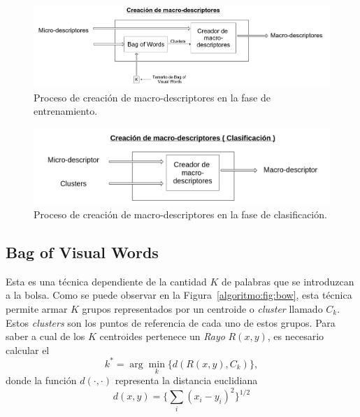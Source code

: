 	
	
		\begin{figure}[bt]
			\centering
			\includegraphics[width=1\textwidth]{Figuras/Diagramas/Extractor_macrodescriptores_entrenamiento.png}
			\caption{Proceso de creación de macro-descriptores en la fase de entrenamiento.}
			\label{algoritmo:fig:macro_descriptores:entrenamiento}
		\end{figure}
	\begin{figure}[bt]
		\centering
    		\includegraphics[width=1\textwidth]{Figuras/Diagramas/Extractor_macrodescriptores_clasificacion.png}
  		\caption{Proceso de creación de macro-descriptores en la fase de clasificación.}
  		\label{algoritmo:fig:macro_descriptores:clasificacion}
	\end{figure}	



	\subsection{Bag of Visual Words}
	\label{algoritmo:bow}
		Esta es una técnica dependiente de la cantidad $K$ de palabras que se introduzcan a la bolsa. Como se puede observar en la Figura~\ref{algoritmo:fig:bow}, esta técnica permite armar $K$ grupos representados por un centroide o \textit{cluster} llamado $C_k$. Estos \textit{clusters} son los puntos de referencia de cada uno de estos grupos. Para saber a cual de los $K$ centroides pertenece un \textit{Rayo} $R(x,y)$, es necesario calcular el
		\begin{equation}
  			\label{algoritmo:eq:dist}
			k^* = \arg \min_k \{\mathit{d}(R(x,y),C_k)\},
		\end{equation}
		donde la función $\mathit{d}(\cdot,\cdot)$ representa la distancia euclidiana 
		\begin{equation}
		 d(x,y) = \Big\{\sum_{i} (x_i-y_i)^2\Big\}^{1/2} 
		\end{equation}
		

